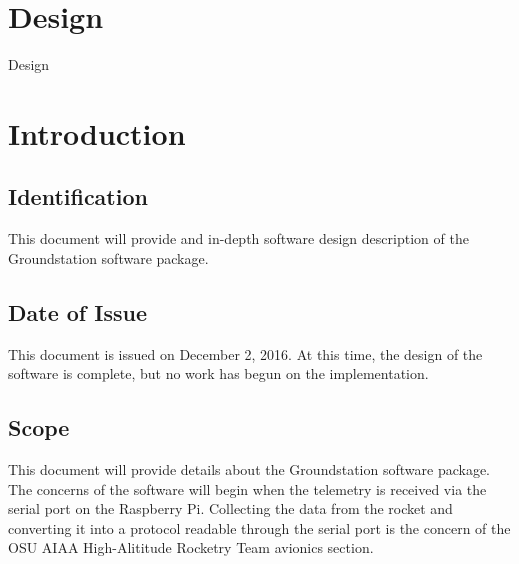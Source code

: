 \documentclass[10pt,draftclsnofoot,onecolumn]{IEEEtran}
\begin{document}
\newpage


	\section{Design}
	\begin{center}
		\huge
		Design\\
	\end{center}
	
	
	


	\section{Introduction}

	\subsection{Identification}
	This document will provide and in-depth software design description of the Groundstation software package.
	
	\subsection{Date of Issue}
	This document is issued on December 2, 2016.
	At this time, the design of the software is complete, but no work has begun on the implementation.
	
	\subsection{Scope}
	This document will provide details about the Groundstation software package.
	The concerns of the software will begin when the telemetry is received via the serial port on the Raspberry Pi.
	Collecting the data from the rocket and converting it into a protocol readable through the serial port is the
	concern of the \ac{OSU} \ac{AIAA} High-Alititude Rocketry Team avionics section.
		
\end{document}

